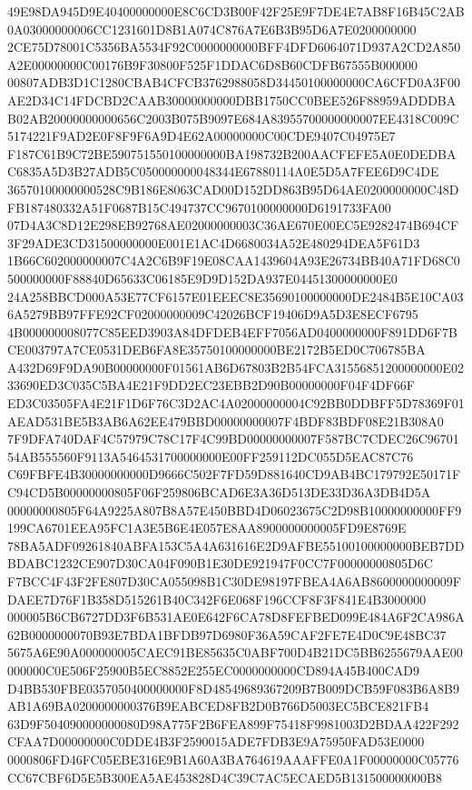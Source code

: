 \documentclass[UTF8,fontset=fandol,zihao=-4,a4paper]{ctexart}
\begin{document}
{{49E98DA945D9E40400000000E8C6CD3B00F42F25E9F7DE4E7AB8F16B45C2AB0A03000000006CC1231601D8B1A074C876A7E6B3B95D6A7E0200000000
2CE75D78001C5356BA5534F92C0000000000BFF4DFD6064071D937A2CD2A850A2E00000000C00176B9F30800F525F1DDAC6D8B60CDFB67555B000000
00807ADB3D1C1280CBAB4CFCB3762988058D34450100000000CA6CFD0A3F00AE2D34C14FDCBD2CAAB30000000000DBB1750CC0BEE526F88959ADDDBA
B02AB20000000000656C2003B075B9097E684A83955700000000007EE4318C009C5174221F9AD2E0F8F9F6A9D4E62A00000000C00CDE9407C04975E7
F187C61B9C72BE590751550100000000BA198732B200AACFEFE5A0E0DEDBAC6835A5D3B27ADB5C050000000048344E67880114A0E5D5A7FEE6D9C4DE
36570100000000528C9B186E8063CAD00D152DD863B95D64AE0200000000C48DFB187480332A51F0687B15C494737CC9670100000000D6191733FA00
07D4A3C8D12E298EB92768AE02000000003C36AE670E00EC5E9282474B694CF3F29ADE3CD31500000000E001E1AC4D6680034A52E480294DEA5F61D3
1B66C602000000007C4A2C6B9F19E08CAA1439604A93E26734BB40A71FD68C0500000000F88840D65633C06185E9D9D152DA937E04451300000000E0
24A258BBCD000A53E77CF6157E01EEEC8E35690100000000DE2484B5E10CA036A5279BB97FFE92CF02000000009C42026BCF19406D9A5D3E8ECF6795
4B000000008077C85EED3903A84DFDEB4EFF7056AD0400000000F891DD6F7BCE003797A7CE0531DEB6FA8E35750100000000BE2172B5ED0C706785BA
A432D69F9DA90B00000000F01561AB6D67803B2B54FCA31556851200000000E0233690ED3C035C5BA4E21F9DD2EC23EBB2D90B00000000F04F4DF66F
ED3C03505FA4E21F1D6F76C3D2AC4A02000000004C92BB0DDBFF5D78369F01AEAD531BE5B3AB6A62EE479BBD00000000007F4BDF83BDF08E21B308A0
7F9DFA740DAF4C57979C78C17F4C99BD00000000007F587BC7CDEC26C9670154AB555560F9113A5464531700000000E00FF259112DC055D5EAC87C76
C69FBFE4B30000000000D9666C502F7FD59D881640CD9AB4BC179792E50171FC94CD5B00000000805F06F259806BCAD6E3A36D513DE33D36A3DB4D5A
00000000805F64A9225A807B8A57E450BBD4D06023675C2D98B10000000000FF9199CA6701EEA95FC1A3E5B6E4E057E8AA8900000000005FD9E8769E
78BA5ADF09261840ABFA153C5A4A631616E2D9AFBE55100100000000BEB7DDBDABC1232CE907D30CA04F090B1E30DE921947F0CC7F00000000805D6C
F7BCC4F43F2FE807D30CA055098B1C30DE98197FBEA4A6AB8600000000009FDAEE7D76F1B358D515261B40C342F6E068F196CCF8F3F841E4B3000000
000005B6CB6727DD3F6B531AE0E642F6CA78D8FEFBED099E484A6F2CA986A62B0000000070B93E7BDA1BFDB97D6980F36A59CAF2FE7E4D0C9E48BC37
5675A6E90A000000005CAEC91BE85635C0ABF700D4B21DC5BB6255679AAE00000000C0E506F25900B5EC8852E255EC0000000000CD894A45B400CAD9
D4BB530FBE0357050400000000F8D48549689367209B7B009DCB59F083B6A8B9AB1A69BA0200000000376B9EABCED8FB2D0B766D5003EC5BCE821FB4
63D9F504090000000080D98A775F2B6FEA899F75418F9981003D2BDAA422F292CFAA7D00000000C0DDE4B3F2590015ADE7FDB3E9A75950FAD53E0000
0000806FD46FC05EBE316E9B1A60A3BA764619AAAFFE0A1F00000000C05776CC67CBF6D5E5B300EA5AE453828D4C39C7AC5ECAED5B131500000000B8
}}
\end{document}
